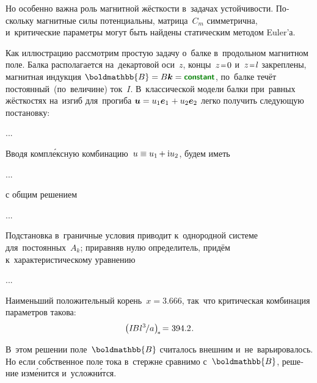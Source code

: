 \begin{otherlanguage}{russian}
Но особенно важна роль магнитной жёсткости в~задачах устойчивости. Поскольку магнитные силы потенциальны, матрица~$C_m$ симметрична, и~критические параметры могут быть найдены статическим методом Euler’а.

Как иллюстрацию рассмотрим простую задачу о~балке в~продольном магнитном поле.
Балка располагается на~декартовой оси~$z$, концы~${z \narroweq 0}$ и~${z \narroweq l}$ закреплены, магнитная индукция ${\boldmathbb{B} = B\bm{k} = \boldconstant}$, по~балке течёт постоянный~(по~величине) ток~$I$.
В~классической модели балки при~равных жёсткостях на~изгиб для~прогиба ${\bm{u} = u_1 \bm{e}_1 \hspace{.16ex} + u_2 \bm{e}_2}$ легко получить следующую постановку:

...

Вводя компл\'{е}ксную комбинацию~${u \equiv u_1 \hspace{-0.16ex} + \mathrm{i} u_2}$, будем иметь

...

\noindent с общим решением

...

\noindent Подстановка в~граничные условия приводит к~однородной системе для~постоянных~${A_k}$; приравняв нулю определитель, придём к~характеристическому уравнению

...

\noindent Наименьший положительный корень~${x = 3.666}$, так~что критическая комбинация параметров такова:
\[
\left( I \hspace{-0.25ex} B \hspace{.1ex} {l^3} \hspace{-0.2ex} / a \hspace{.1ex} \right)_{\hspace{-0.32ex}*} \hspace{-0.32ex} = \hspace{.1ex} 394.2 \hspace{.12ex}.
\]

В~этом решении поле~$\boldmathbb{B}$ считалось внешним и~не~варьировалось.
Но если собственное поле тока в~стержне сравнимо с~$\boldmathbb{B}$, решение изм\'{е}нится и~усложн\'{и}тся.

\end{otherlanguage}

\section*{\small \wordforbibliography}

